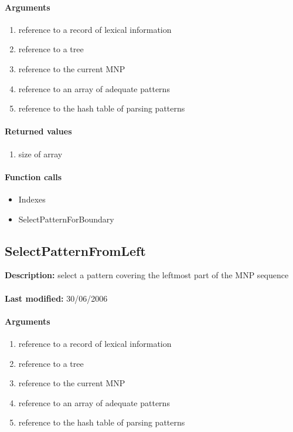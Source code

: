\paragraph{Arguments}
\begin{enumerate}
\item reference to a record of lexical information
\item reference to a tree
\item reference to the current MNP
\item reference to an array of adequate patterns
\item reference to the hash table of parsing patterns
\end{enumerate}

\paragraph{Returned values}
\begin{enumerate}
\item size of array

\end{enumerate}

\paragraph{Function calls}
\begin{itemize}
\item Indexes
\item SelectPatternForBoundary
\end{itemize}

\subsection{SelectPatternFromLeft}
\textbf{Description:} select a pattern covering the leftmost part of the MNP sequence\\
\\\textbf{Last modified:} 30/06/2006

\paragraph{Arguments}
\begin{enumerate}
\item reference to a record of lexical information
\item reference to a tree
\item reference to the current MNP
\item reference to an array of adequate patterns
\item reference to the hash table of parsing patterns
\end{enumerate}

